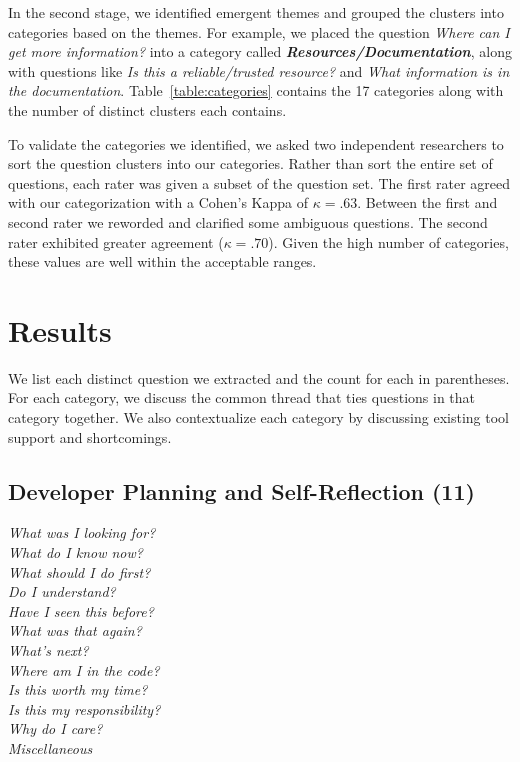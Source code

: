 \documentclass[conference]{IEEEtran}
\begin{document}
In the second stage, we identified emergent themes and grouped the clusters into categories based on the themes. 
For example, we placed the question \textit{Where can I get more information?} into a category called \emph{\textbf{Resources/Documentation}}, along with questions like \textit{Is this a reliable/trusted resource?} and \textit{What information is in the documentation}. 
Table~\ref{table:categories} contains the 17 categories along with the number of distinct clusters each contains. 

To validate the categories we identified, we asked two independent researchers to sort the question clusters into our categories. 
Rather than sort the entire set of questions, each rater was given a subset of the question set. 
The first rater agreed with our categorization with a Cohen's Kappa of $\kappa = .63$. 
Between the first and second rater we reworded and clarified some ambiguous questions. The second rater exhibited greater agreement ($\kappa = .70$). 
Given the high number of categories, these values are well within the acceptable ranges.

\section{Results}
\label{sec:results}
We list each distinct question we extracted and the count for each in parentheses. For each category, we discuss the common thread that ties questions in that category together. We also contextualize each category by discussing existing tool support and shortcomings.

\noindent\subsection{\textbf{Developer Planning and Self-Reflection (11)}} 

\noindent\emph{What was I looking for?} \\
\emph{What do I know now?} \\
\emph{What should I do first?} \\
\emph{Do I understand?} \\
\emph{Have I seen this before?} \\
\emph{What was that again?} \\
\emph{What's next?} \\
\emph{Where am I in the code?} \\
\emph{Is this worth my time?} \\
\emph{Is this my responsibility?} \\
\emph{Why do I care?} \\
\emph{Miscellaneous} \\
\end{document}

